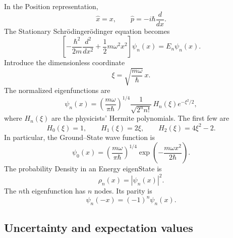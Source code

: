 \documentclass[a4paper, 10pt, onepage]{elegantbook}
\begin{document}
{In the Position representation,
\begin{equation}
  \hat{x}=x,\qquad
  \hat{p}=-i\hbar\frac{d}{dx}.
\end{equation}
The Stationary Schr\"odinger\"odinger equation becomes
\begin{equation}
  \left[
    -\frac{\hbar^2}{2m}\frac{d^2}{dx^2}
    +\frac{1}{2}m\omega^2x^2
  \right]\psi_n(x)
  =E_n\psi_n(x).
\end{equation}
Introduce the dimensionless coordinate
\begin{equation}
  \xi=\sqrt{\frac{m\omega}{\hbar}}\,x.
\end{equation}
The normalized eigenfunctions are
\begin{equation}
  \psi_n(x)
  =
  \left(\frac{m\omega}{\pi\hbar}\right)^{1/4}
  \frac{1}{\sqrt{2^n n!}}\,
  H_n(\xi)e^{-\xi^2/2},
\end{equation}
where $H_n(\xi)$ are the physicists' Hermite polynomials. The first
few are
\begin{equation}
  H_0(\xi)=1,\qquad
  H_1(\xi)=2\xi,\qquad
  H_2(\xi)=4\xi^2-2.
\end{equation}
In particular, the Ground--State wave function is
\begin{equation}
  \psi_0(x)
  =\left(\frac{m\omega}{\pi\hbar}\right)^{1/4}
   \exp\left(-\frac{m\omega x^2}{2\hbar}\right).
\end{equation}
The probability Density in an Energy eigenState is
\begin{equation}
  \rho_n(x)=|\psi_n(x)|^2.
\end{equation}
The $n$th eigenfunction has $n$ nodes. Its parity is
\begin{equation}
  \psi_n(-x)=(-1)^n\psi_n(x).
\end{equation}

\subsection{Uncertainty and expectation values}

}
\end{document}

